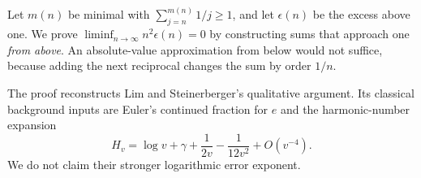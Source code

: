 Let $m(n)$ be minimal with $\sum_{j=n}^{m(n)}1/j\ge1$, and let $\epsilon(n)$ be the excess above one. We prove $\liminf_{n\to\infty}n^2\epsilon(n)=0$ by constructing sums that approach one \emph{from above}. An absolute-value approximation from below would not suffice, because adding the next reciprocal changes the sum by order $1/n$.

The proof reconstructs Lim and Steinerberger's qualitative argument. Its classical background inputs are Euler's continued fraction for $e$ and the harmonic-number expansion
\[
 H_v=\log v+\gamma+\frac1{2v}-\frac1{12v^2}+O(v^{-4}).\tag{1}
\]
We do not claim their stronger logarithmic error exponent.

